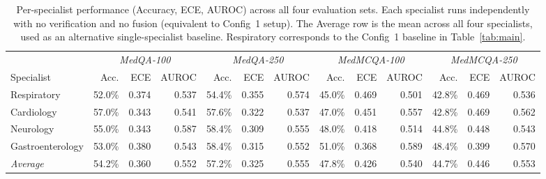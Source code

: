 \begin{table}[ht]
\caption{Per-specialist performance (Accuracy, ECE, AUROC) across all four
evaluation sets. Each specialist runs independently with no verification
and no fusion (equivalent to Config~1 setup). The Average row is the
mean across all four specialists, used as an alternative single-specialist
baseline. Respiratory corresponds to the Config~1 baseline in Table~\ref{tab:main}.}
\label{tab:per_specialist}
\begin{center}
\small
\begin{tabular}{lrrrrrrrrrrrr}
\toprule
& \multicolumn{3}{c}{\textit{MedQA-100}} & \multicolumn{3}{c}{\textit{MedQA-250}} & \multicolumn{3}{c}{\textit{MedMCQA-100}} & \multicolumn{3}{c}{\textit{MedMCQA-250}} \\
\cmidrule(lr){2-4} \cmidrule(lr){5-7} \cmidrule(lr){8-10} \cmidrule(lr){11-13}
Specialist & Acc. & ECE & AUROC & Acc. & ECE & AUROC & Acc. & ECE & AUROC & Acc. & ECE & AUROC \\
\midrule
Respiratory & 52.0\% & 0.374 & 0.537 & 54.4\% & 0.355 & 0.574 & 45.0\% & 0.469 & 0.501 & 42.8\% & 0.469 & 0.536 \\
Cardiology & 57.0\% & 0.343 & 0.541 & 57.6\% & 0.322 & 0.537 & 47.0\% & 0.451 & 0.557 & 42.8\% & 0.469 & 0.562 \\
Neurology & 55.0\% & 0.343 & 0.587 & 58.4\% & 0.309 & 0.555 & 48.0\% & 0.418 & 0.514 & 44.8\% & 0.448 & 0.543 \\
Gastroenterology & 53.0\% & 0.380 & 0.543 & 58.4\% & 0.315 & 0.552 & 51.0\% & 0.368 & 0.589 & 48.4\% & 0.399 & 0.570 \\
\midrule
\textit{Average} & 54.2\% & 0.360 & 0.552 & 57.2\% & 0.325 & 0.555 & 47.8\% & 0.426 & 0.540 & 44.7\% & 0.446 & 0.553 \\
\bottomrule
\end{tabular}
\end{center}
\end{table}